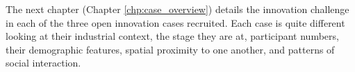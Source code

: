 The next chapter (Chapter \ref{chp:case_overview}) details the innovation challenge in each of the three open innovation cases recruited. Each case is quite different looking at their industrial context, the stage they are at, participant numbers, their demographic features, spatial proximity to one another, and patterns of social interaction. 